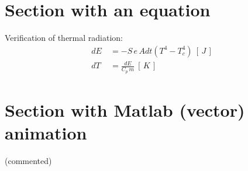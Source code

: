 

\section{Section with an equation}%


\begin{frame}
	\vspace{6mm}
	Verification of thermal radiation:
	\begin{align*}
	dE 	   ~&=  - S \,e\, A dt (T^4 - T_c^4) ~ \left[ \,J\, \right]\\
	dT     ~&= \frac{dE}{C_p\, m} ~ \left[ \,K\, \right]
	\end{align*}

\end{frame}



\section{Section with Matlab (vector) animation}%

\begin{frame}
	(commented)


\end{frame}







